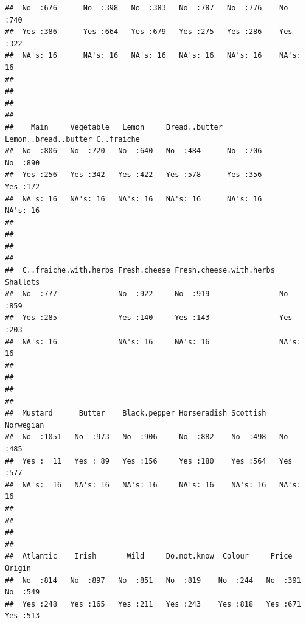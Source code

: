 \documentclass[
]{book}
\begin{document}
\begin{verbatim}
##  No  :676      No  :398   No  :383   No  :787   No  :776    No  :740  
##  Yes :386      Yes :664   Yes :679   Yes :275   Yes :286    Yes :322  
##  NA's: 16      NA's: 16   NA's: 16   NA's: 16   NA's: 16    NA's: 16  
##                                                                       
##                                                                       
##                                                                       
##                                                                       
##    Main     Vegetable   Lemon     Bread..butter Lemon..bread..butter C..fraiche
##  No  :806   No  :720   No  :640   No  :484      No  :706             No  :890  
##  Yes :256   Yes :342   Yes :422   Yes :578      Yes :356             Yes :172  
##  NA's: 16   NA's: 16   NA's: 16   NA's: 16      NA's: 16             NA's: 16  
##                                                                                
##                                                                                
##                                                                                
##                                                                                
##  C..fraiche.with.herbs Fresh.cheese Fresh.cheese.with.herbs Shallots  
##  No  :777              No  :922     No  :919                No  :859  
##  Yes :285              Yes :140     Yes :143                Yes :203  
##  NA's: 16              NA's: 16     NA's: 16                NA's: 16  
##                                                                       
##                                                                       
##                                                                       
##                                                                       
##  Mustard      Butter    Black.pepper Horseradish Scottish   Norwegian 
##  No  :1051   No  :973   No  :906     No  :882    No  :498   No  :485  
##  Yes :  11   Yes : 89   Yes :156     Yes :180    Yes :564   Yes :577  
##  NA's:  16   NA's: 16   NA's: 16     NA's: 16    NA's: 16   NA's: 16  
##                                                                       
##                                                                       
##                                                                       
##                                                                       
##  Atlantic    Irish       Wild     Do.not.know  Colour     Price      Origin   
##  No  :814   No  :897   No  :851   No  :819    No  :244   No  :391   No  :549  
##  Yes :248   Yes :165   Yes :211   Yes :243    Yes :818   Yes :671   Yes :513  

\end{verbatim}
\end{document}
